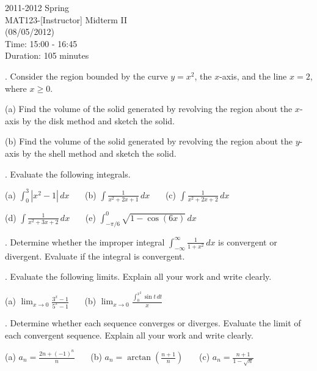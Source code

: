 \documentclass{article}
\begin{document}
\pagestyle{empty}
\large

\begin{center}
2011-2012 Spring \\MAT123-[Instructor] Midterm II\\(08/05/2012)\\Time: 15:00 - 16:45\\Duration: 105 minutes
\end{center}

. Consider the region bounded by the curve $y=x^2$, the $x$-axis, and the line $x=2$, where $x\geq0$.

\hfill

(a) Find the volume of the solid generated by revolving the region about the $x$-axis by the disk method and sketch the solid.

\hfill

(b) Find the volume of the solid generated by revolving the region about the $y$-axis by the shell method and sketch the solid.

\hfill

. Evaluate the following integrals.

\hfill

(a) $\displaystyle \int_0^3\left|x^2-1\right|\, dx$ \ \ \ (b) $\displaystyle\int\frac1{x^2+2x+1}\,dx$ \ \ \ (c) $\displaystyle\int\frac1{x^2+2x+2}\,dx$

\hfill

(d) $\displaystyle\int\frac1{x^2+3x+2}\,dx$ \ \ \ (e) $\displaystyle\int_{-\pi/6}^0\sqrt{1-\cos(6x)}\,dx$

\hfill

. Determine whether the improper integral $\displaystyle\int_{-\infty}^\infty\frac1{1+x^2}\,dx$ is convergent or divergent. Evaluate if the integral is convergent.

\hfill

. Evaluate the following limits. Explain all your work and write clearly.

\hfill

(a) $\displaystyle\lim_{x\to0}\frac{3^x-1}{5^x-1}$ \ \ \ (b) $\displaystyle \lim_{x\to0}\frac{\displaystyle\int_0^{x^2}\sin t\,dt}x$

\hfill

. Determine whether each sequence converges or diverges. Evaluate the limit of each convergent sequence. Explain all your work and write clearly.

\hfill

(a) $\displaystyle a_n=\frac{2n+(-1)^n}n$ \ \ \ (b) $\displaystyle a_n=\arctan\left(\frac{n+1}n\right)$ \ \ \ (c) $\displaystyle a_n = \frac{n+1}{1-\sqrt n}$
\end{document}
